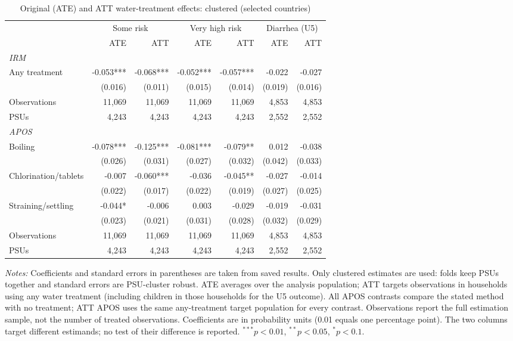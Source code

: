 \begin{table}[htbp]
\centering
\caption{Original (ATE) and ATT water-treatment effects: clustered (selected countries)}
\label{tab:table-ate-att-main-selected-countries}
\scriptsize
\begin{adjustbox}{max width=\linewidth}
\begin{tabular}{lrrrrrr}
\toprule
 & \multicolumn{2}{c}{Some risk} & \multicolumn{2}{c}{Very high risk} & \multicolumn{2}{c}{Diarrhea (U5)} \\
 & ATE & ATT & ATE & ATT & ATE & ATT \\
\midrule
\multicolumn{7}{l}{\textit{IRM}} \\
Any treatment & -0.053*** & -0.068*** & -0.052*** & -0.057*** & -0.022 & -0.027 \\
 & (0.016) & (0.011) & (0.015) & (0.014) & (0.019) & (0.016) \\
Observations & 11,069 & 11,069 & 11,069 & 11,069 & 4,853 & 4,853 \\
PSUs & 4,243 & 4,243 & 4,243 & 4,243 & 2,552 & 2,552 \\
\midrule
\multicolumn{7}{l}{\textit{APOS}} \\
Boiling & -0.078*** & -0.125*** & -0.081*** & -0.079** & 0.012 & -0.038 \\
 & (0.026) & (0.031) & (0.027) & (0.032) & (0.042) & (0.033) \\
Chlorination/tablets & -0.007 & -0.060*** & -0.036 & -0.045** & -0.027 & -0.014 \\
 & (0.022) & (0.017) & (0.022) & (0.019) & (0.027) & (0.025) \\
Straining/settling & -0.044* & -0.006 & 0.003 & -0.029 & -0.019 & -0.031 \\
 & (0.023) & (0.021) & (0.031) & (0.028) & (0.032) & (0.029) \\
Observations & 11,069 & 11,069 & 11,069 & 11,069 & 4,853 & 4,853 \\
PSUs & 4,243 & 4,243 & 4,243 & 4,243 & 2,552 & 2,552 \\
\bottomrule
\end{tabular}
\end{adjustbox}
\par\vspace{3pt}
\begin{minipage}{\linewidth}\scriptsize \textit{Notes:} Coefficients and standard errors in parentheses are taken from saved results. Only clustered estimates are used: folds keep PSUs together and standard errors are PSU-cluster robust. ATE averages over the analysis population; ATT targets observations in households using any water treatment (including children in those households for the U5 outcome). All APOS contrasts compare the stated method with no treatment; ATT APOS uses the same any-treatment target population for every contrast. Observations report the full estimation sample, not the number of treated observations. Coefficients are in probability units (0.01 equals one percentage point). The two columns target different estimands; no test of their difference is reported. $^{***}p<0.01$, $^{**}p<0.05$, $^{*}p<0.1$. \end{minipage}
\end{table}
